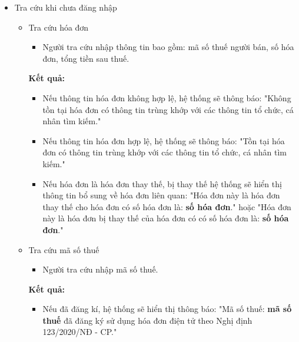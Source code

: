 \begin{itemize}
\begin{itemize}
\item Tra cứu khi chưa đăng nhập

\begin{itemize}

\item Tra cứu hóa đơn

\begin{itemize}

\item Người tra cứu nhập thông tin bao gồm: mã số thuế người bán, số hóa đơn, tổng tiền sau thuế.

\end{itemize}

\textbf{Kết quả:}

\begin{itemize}

\item Nếu thông tin hóa đơn không hợp lệ, hệ thống sẽ thông báo: "Không tồn tại hóa đơn có thông tin trùng khớp với các thông tin tổ chức, cá nhân tìm kiếm." %

\item Nếu thông tin hóa đơn hợp lệ, hệ thống sẽ thông báo: "Tồn tại hóa đơn có thông tin trùng khớp với các thông tin tổ chức, cá nhân tìm kiếm." %

\item Nếu hóa đơn là hóa đơn thay thế, bị thay thế hệ thống sẽ hiển thị thông tin bổ sung về hóa đơn liên quan: "Hóa đơn này là hóa đơn thay thế cho hóa đơn có số hóa đơn là: \textbf{số hóa đơn}." hoặc "Hóa đơn này là hóa đơn bị thay thế của hóa đơn có có số hóa đơn là: \textbf{số hóa đơn}." %

\end{itemize}

\item Tra cứu mã số thuế

\begin{itemize}

\item Người tra cứu nhập mã số thuế.

\end{itemize}

\textbf{Kết quả:}

\begin{itemize}

\item Nếu đã đăng kí, hệ thống sẽ hiển thị thông báo: "Mã số thuế: \textbf{mã số thuế} đã đăng ký sử dụng hóa đơn điện tử theo Nghị định 123/2020/NĐ - CP." %


\end{itemize}
\end{itemize}
\end{itemize}
\end{itemize}
